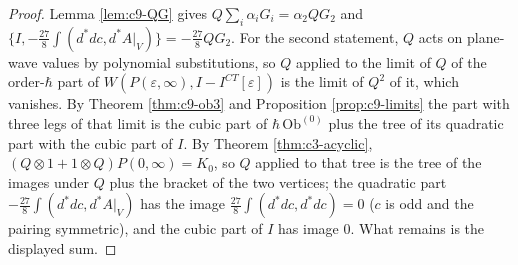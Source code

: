 \begin{proof}
Lemma \ref{lem:c9-QG} gives $Q\sum_i\alpha_iG_i=\alpha_2QG_2$ and $\{I,-\tfrac{27}8\int(d^*dc,d^*A|_V)\}=-\tfrac{27}8QG_2$. For the second statement, $Q$ acts on plane-wave values by polynomial substitutions, so $Q$ applied to the limit of $Q$ of the order-$\hbar$ part of $W(P(\varepsilon,\infty),I-I^{CT}[\varepsilon])$ is the limit of $Q^2$ of it, which vanishes. By Theorem \ref{thm:c9-ob3} and Proposition \ref{prop:c9-limits} the part with three legs of that limit is the cubic part of $\hbar\,\mathrm{Ob}^{(0)}$ plus the tree of its quadratic part with the cubic part of $I$. By Theorem \ref{thm:c3-acyclic}, $(Q\otimes1+1\otimes Q)P(0,\infty)=K_0$, so $Q$ applied to that tree is the tree of the images under $Q$ plus the bracket of the two vertices; the quadratic part $-\tfrac{27}8\int(d^*dc,d^*A|_V)$ has the image $\tfrac{27}8\int(d^*dc,d^*dc)=0$ ($c$ is odd and the pairing symmetric), and the cubic part of $I$ has image $0$. What remains is the displayed sum.
\end{proof}

